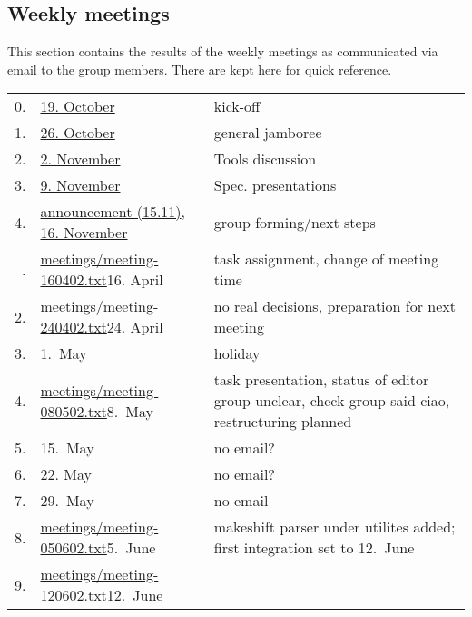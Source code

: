
\subsection*{Weekly meetings}
\label{sec:meetings}


This section contains the results of the weekly meetings as communicated
via email to the group members. There are kept here for quick reference.




  \begin{table}[htbp]
    \centering
    \begin{tabular}[t]{r@{\quad}l@{\quad\quad}p{9cm}}
    \\\hline
    0.
    &
    \href{meetings/2004-10-19.txt}{19. October}
    &
    kick-off
    \\
    1.
    &
    \href{meetings/2004-10-26.txt}{26. October}
    &
    general jamboree
    \\
    2.
    &
    \href{meetings/2004-11-02.txt}{2. November}
    &
    Tools discussion
    \\
    3.
    &
    \href{meetings/2004-11-09.txt}{9. November}
    &
    Spec. presentations
    \\
    4.
    &
    \href{meetings/2004-11-15-a.txt}{announcement (15.11)},
    \href{meetings/2004-11-16.txt}{16. November}
    &
    group forming/next steps
    \\\hline
\iffalse
    1.
    &
    \url{meetings/meeting-160402.txt}{16. April}
    &
    task assignment, change of meeting time
    \\
    2.
    & 
    \url{meetings/meeting-240402.txt}{24. April}
    &
    no real decisions, preparation for next meeting
    \\
    3.
    &
    1.\ May
    &
    holiday
    \\
    4.
    &
    \url{meetings/meeting-080502.txt}{8.\ May}
    & 
    task presentation, status of editor group unclear,
    check group said ciao, restructuring planned
    \\
    5.
    &
    15.\ May
    &
    no email?
    \\
    6.
    &
    22. May
    &
    no email?
    \\
    7.
    &
    29.\ May
    &
    no email
    \\
    8.
    &
    \url{meetings/meeting-050602.txt}{5.\ June}
    &
    makeshift parser under utilites added; first
    integration set to 12.\ June
    \\
    9.
    &
    \url{meetings/meeting-120602.txt}{12.\ June}

\end{tabular}
\end{table}
